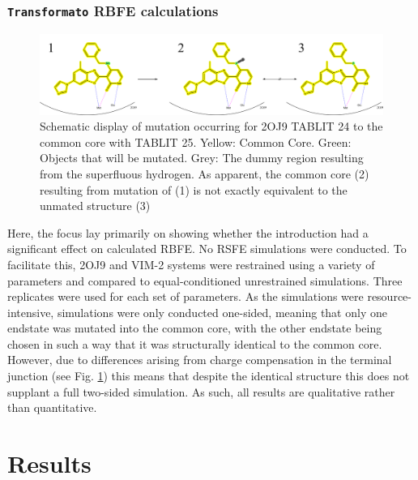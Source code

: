 \documentclass[oneside]{scrreprt}
\begin{document}
\subsection{\texttt{Transformato} RBFE calculations}
\begin{figure}[h]\label{fig:CCnotEq}
    \centering
    \includegraphics[width=1\textwidth]{CCnotEq.png}
    \caption[Schematic display of mutation occurring for 2OJ9 TABLIT 24 to the common core with TABLIT 25.]{Schematic display of mutation occurring for 2OJ9 TABLIT 24 to the common core with TABLIT 25. Yellow: Common Core. Green: Objects that will be mutated. Grey: The dummy region resulting from the superfluous hydrogen. As apparent, the common core (2) resulting from mutation of (1) is not exactly equivalent to the unmated structure (3)}
    
\end{figure}
Here, the focus lay primarily on showing whether the introduction had a significant effect on calculated RBFE. No RSFE simulations were conducted. To facilitate this, 2OJ9 and VIM-2 systems were restrained using a variety of parameters and compared to equal-conditioned unrestrained simulations. Three replicates were used for each set of parameters. As the simulations were resource-intensive, simulations were only conducted one-sided, meaning that only one endstate was mutated into the common core, with the other endstate being chosen in such a way that it was structurally identical to the common core. However, due to differences arising from charge compensation in the terminal junction (see Fig. \ref{fig:CCnotEq}) this means that despite the identical structure this does not supplant a full two-sided simulation. As such, all results are qualitative rather than quantitative.



\chapter{Results}
\end{document}

